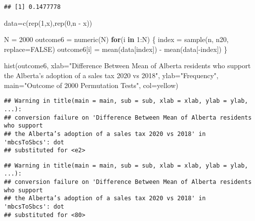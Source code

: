 \documentclass[
]{article}
\newenvironment{Shaded}{\begin{snugshade}}{\end{snugshade}}
\newcommand{\AttributeTok}[1]{\textcolor[rgb]{0.77,0.63,0.00}{#1}}
\newcommand{\ConstantTok}[1]{\textcolor[rgb]{0.00,0.00,0.00}{#1}}
\newcommand{\ControlFlowTok}[1]{\textcolor[rgb]{0.13,0.29,0.53}{\textbf{#1}}}
\newcommand{\DecValTok}[1]{\textcolor[rgb]{0.00,0.00,0.81}{#1}}
\newcommand{\FunctionTok}[1]{\textcolor[rgb]{0.00,0.00,0.00}{#1}}
\newcommand{\NormalTok}[1]{#1}
\newcommand{\OtherTok}[1]{\textcolor[rgb]{0.56,0.35,0.01}{#1}}
\newcommand{\SpecialCharTok}[1]{\textcolor[rgb]{0.00,0.00,0.00}{#1}}
\newcommand{\StringTok}[1]{\textcolor[rgb]{0.31,0.60,0.02}{#1}}
\begin{document}
\begin{verbatim}
## [1] 0.1477778
\end{verbatim}

\begin{Shaded}
\begin{Highlighting}[]
\NormalTok{data}\OtherTok{=}\FunctionTok{c}\NormalTok{(}\FunctionTok{rep}\NormalTok{(}\DecValTok{1}\NormalTok{,x),}\FunctionTok{rep}\NormalTok{(}\DecValTok{0}\NormalTok{,n }\SpecialCharTok{{-}}\NormalTok{ x))}

\NormalTok{N }\OtherTok{=} \DecValTok{2000}
\NormalTok{outcome6 }\OtherTok{=} \FunctionTok{numeric}\NormalTok{(N)}
\ControlFlowTok{for}\NormalTok{(i }\ControlFlowTok{in} \DecValTok{1}\SpecialCharTok{:}\NormalTok{N)}
\NormalTok{\{ index }\OtherTok{=} \FunctionTok{sample}\NormalTok{(n, n20, }\AttributeTok{replace=}\ConstantTok{FALSE}\NormalTok{)}
\NormalTok{  outcome6[i] }\OtherTok{=} \FunctionTok{mean}\NormalTok{(data[index]) }\SpecialCharTok{{-}} \FunctionTok{mean}\NormalTok{(data[}\SpecialCharTok{{-}}\NormalTok{index]) }
\NormalTok{\}}
\end{Highlighting}
\end{Shaded}

\begin{Shaded}
\begin{Highlighting}[]
\FunctionTok{hist}\NormalTok{(outcome6, }\AttributeTok{xlab=}\StringTok{"Difference Between Mean of Alberta residents who support the Alberta’s adoption of a sales tax 2020 vs 2018"}\NormalTok{, }\AttributeTok{ylab=}\StringTok{"Frequency"}\NormalTok{, }\AttributeTok{main=}\StringTok{"Outcome of 2000 Permutation Tests"}\NormalTok{, }\AttributeTok{col=}\StringTok{\textquotesingle{}yellow\textquotesingle{}}\NormalTok{)}
\end{Highlighting}
\end{Shaded}

\begin{verbatim}
## Warning in title(main = main, sub = sub, xlab = xlab, ylab = ylab, ...):
## conversion failure on 'Difference Between Mean of Alberta residents who support
## the Alberta’s adoption of a sales tax 2020 vs 2018' in 'mbcsToSbcs': dot
## substituted for <e2>
\end{verbatim}

\begin{verbatim}
## Warning in title(main = main, sub = sub, xlab = xlab, ylab = ylab, ...):
## conversion failure on 'Difference Between Mean of Alberta residents who support
## the Alberta’s adoption of a sales tax 2020 vs 2018' in 'mbcsToSbcs': dot
## substituted for <80>
\end{verbatim}
\end{document}
